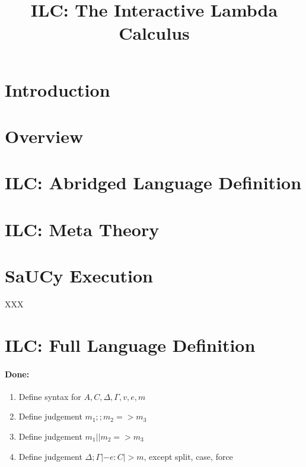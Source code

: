 \documentclass{llncs}
\title{ILC: The Interactive Lambda Calculus}
\begin{document}
\maketitle

\begin{abstract}

\end{abstract}

\section{Introduction}

\section{Overview}

\section{ILC: Abridged Language Definition}

\section{ILC: Meta Theory}

\section{SaUCy Execution}


\begin{theorem}
\label{thm:read-det}
XXX
\end{theorem}

\appendix
\section{ILC: Full Language Definition}


\paragraph{Done:}
\begin{enumerate}
\item Define syntax for $A, C, \Delta, \Gamma, v, e, m$
\item Define judgement $m_1 ;; m_2 => m_3$
\item Define judgement $m_1 || m_2 => m_3$
\item Define judgement $\Delta; \Gamma |- e : C |> m$, except split, case, force
\end{enumerate}
\end{document}

